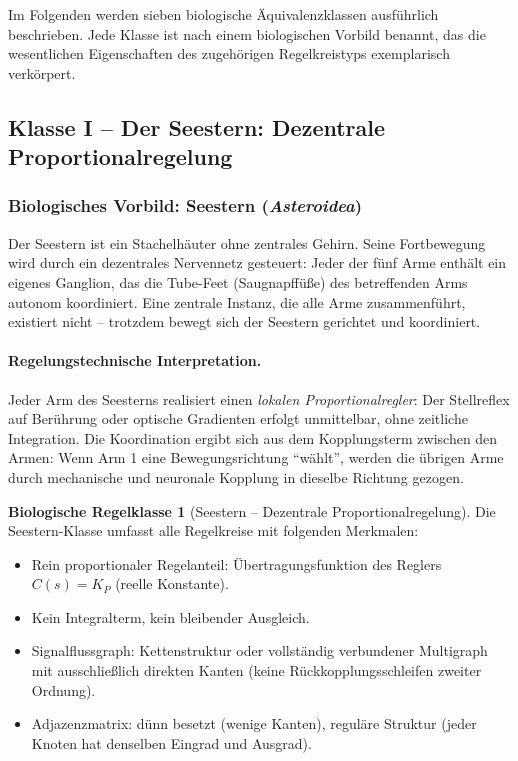 \documentclass[a4paper,12pt]{article}
\theoremstyle{definition}
\newtheorem{klasse}{Biologische Regelklasse}
\begin{document}
Im Folgenden werden sieben biologische Äquivalenzklassen ausführlich beschrieben.
Jede Klasse ist nach einem biologischen Vorbild benannt, das die wesentlichen
Eigenschaften des zugehörigen Regelkreistyps exemplarisch verkörpert.

\subsection{Klasse I -- Der Seestern: Dezentrale Proportionalregelung}
\label{subsec:klasse_seestern}

\subsubsection{Biologisches Vorbild: Seestern (\textit{Asteroidea})}

Der Seestern ist ein Stachelhäuter ohne zentrales Gehirn. Seine Fortbewegung
wird durch ein dezentrales Nervennetz gesteuert: Jeder der fünf Arme enthält
ein eigenes Ganglion, das die Tube-Feet (Saugnapffüße) des betreffenden Arms
autonom koordiniert. Eine zentrale Instanz, die alle Arme zusammenführt,
existiert nicht -- trotzdem bewegt sich der Seestern gerichtet und koordiniert.

\paragraph{Regelungstechnische Interpretation.}
Jeder Arm des Seesterns realisiert einen \emph{lokalen Proportionalregler}:
Der Stellreflex auf Berührung oder optische Gradienten erfolgt unmittelbar, ohne
zeitliche Integration. Die Koordination ergibt sich aus dem Kopplungsterm zwischen
den Armen: Wenn Arm 1 eine Bewegungsrichtung ``wählt'', werden die übrigen Arme
durch mechanische und neuronale Kopplung in dieselbe Richtung gezogen.

\begin{klasse}[Seestern -- Dezentrale Proportionalregelung]
	\label{kl:seestern}
	Die Seestern-Klasse umfasst alle Regelkreise mit folgenden Merkmalen:
	\begin{itemize}
		\item Rein proportionaler Regelanteil: Übertragungsfunktion des Reglers
		$C(s) = K_P$ (reelle Konstante).
		\item Kein Integralterm, kein bleibender Ausgleich.
		\item Signalflussgraph: Kettenstruktur oder vollständig verbundener Multigraph
		mit ausschließlich direkten Kanten (keine Rückkopplungsschleifen
		zweiter Ordnung).
		\item Adjazenzmatrix: dünn besetzt (wenige Kanten), reguläre Struktur
		(jeder Knoten hat denselben Eingrad und Ausgrad).
	\end{itemize}
\end{klasse}
\end{document}
